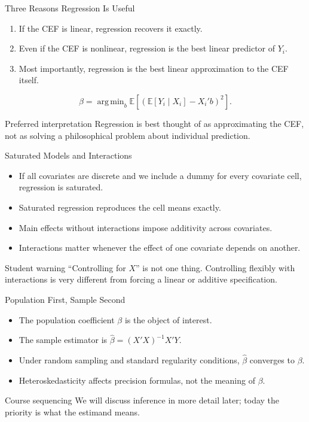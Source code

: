 \documentclass[11pt,aspectratio=169]{beamer}
\newcommand{\E}{\mathbb{E}}
\newcommand{\argmin}{\mathop{\mathrm{arg\,min}}}
\newcommand{\derivbutton}[1]{\vspace{0.4em}\hfill\hyperlink{app:#1}{\beamerbutton{Appendix details}}}
\begin{document}
\begin{frame}{Three Reasons Regression Is Useful}
  \hypertarget{main:reg-just}{}
  \begin{enumerate}
    \item If the CEF is linear, regression recovers it exactly.
    \item Even if the CEF is nonlinear, regression is the best linear predictor of \(Y_i\).
    \item Most importantly, regression is the best linear approximation to the CEF itself.
  \end{enumerate}
  \[
    \beta
    =
    \argmin_b
    \E\left[\left(\E[Y_i \mid X_i]-X_i'b\right)^2\right].
  \]
  \begin{block}{Preferred interpretation}
    Regression is best thought of as approximating the CEF, not as solving a philosophical problem about individual prediction.
  \end{block}
  \derivbutton{reg-justification}
\end{frame}

\begin{frame}{Saturated Models and Interactions}
  \begin{itemize}
    \item If all covariates are discrete and we include a dummy for every covariate cell, regression is saturated.
    \item Saturated regression reproduces the cell means exactly.
    \item Main effects without interactions impose additivity across covariates.
    \item Interactions matter whenever the effect of one covariate depends on another.
  \end{itemize}
  \begin{block}{Student warning}
    ``Controlling for \(X\)'' is not one thing. Controlling flexibly with interactions is very different from forcing a linear or additive specification.
  \end{block}
\end{frame}

\begin{frame}{Population First, Sample Second}
  \begin{itemize}
    \item The population coefficient \(\beta\) is the object of interest.
    \item The sample estimator is \(\hat{\beta}=(X'X)^{-1}X'Y\).
    \item Under random sampling and standard regularity conditions, \(\hat{\beta}\) converges to \(\beta\).
    \item Heteroskedasticity affects precision formulas, not the meaning of \(\beta\).
  \end{itemize}
  \begin{block}{Course sequencing}
    We will discuss inference in more detail later; today the priority is what the estimand means.
  \end{block}
\end{frame}
\end{document}
